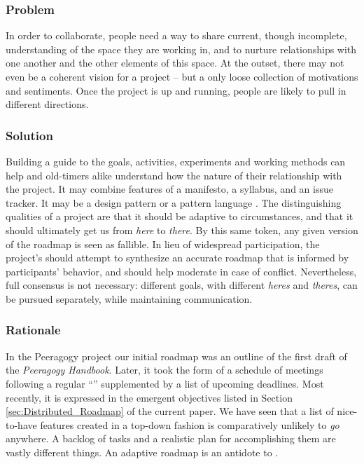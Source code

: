 \subsubsection*{Problem} In order to collaborate, people need a way to share current, though incomplete, understanding of the space they are working in, and to nurture relationships with one another and the other elements of this space.  At the outset, there may not even be a coherent vision for a project -- but a only loose collection of motivations and sentiments.  Once the project is up and running, people are likely to pull in different directions.   

\subsubsection*{Solution}  Building a guide to the goals, activities, experiments and working methods can help  and old-timers alike understand how the nature of their relationship with the project.  %
It may combine features of a manifesto, a syllabus, and an issue tracker.  It may be a design pattern or a pattern language \cite{kohls2010structure}.  The distinguishing qualities of a project  are that it should be adaptive to circumstances, and that it should ultimately get us from \emph{here} to \emph{there}.  By this same token, any given version of the roadmap is seen as fallible.  %
In lieu of widespread participation, the project's  should attempt to synthesize an accurate roadmap that is informed by participants' behavior, and should help moderate in case of conflict.  Nevertheless, full consensus is not necessary: different goals, with different \emph{heres} and \emph{theres}, can be pursued separately, while maintaining communication.

\subsubsection*{Rationale} 
In the Peeragogy project our initial roadmap was an outline of the
first draft of the \emph{Peeragogy Handbook}.  
Later, it took the form
of a schedule of meetings following a regular
``'' supplemented by a list of upcoming
deadlines.  Most recently, it is expressed in the emergent
objectives listed in Section \ref{sec:Distributed_Roadmap} of the
current paper.  We have seen that a list of nice-to-have features created
in a top-down fashion is comparatively unlikely to \emph{go} anywhere.
A backlog of tasks and a realistic plan for accomplishing them are
vastly different things.  An adaptive roadmap is an
antidote to 
\cite[pp. 121--124]{david2001software}. 

